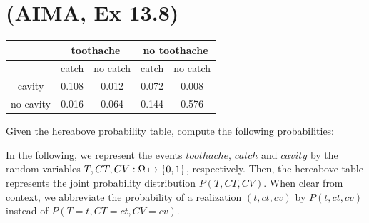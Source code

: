 \documentclass[11pt, a4paper]{article}
\begin{document}
\newpage

\section{(AIMA, Ex 13.8)}

\begin{center}
    \begin{tabular}{|c|c|c|c|c|}
        \hline
        & \multicolumn{2}{c|}{toothache} & \multicolumn{2}{c|}{no toothache} \\ \hline
        & catch & no catch & catch & no catch \\ \hline
        cavity & 0.108 & 0.012 & 0.072 & 0.008 \\ \hline
        no cavity & 0.016 & 0.064 & 0.144 & 0.576 \\ \hline
    \end{tabular}
    \vspace{1ex}
\end{center}

Given the hereabove probability table, compute the following probabilities:

\begin{solution}
    In the following, we represent the events $toothache$, $catch$ and $cavity$ by the random variables $T, CT, CV: \Omega \mapsto \{0, 1\}$, respectively. Then, the hereabove table represents the joint probability distribution $P(T, CT, CV)$. When clear from context, we abbreviate the probability of a realization $(t, ct, cv)$ by $P(t, ct, cv)$ instead of $P(T = t, CT = ct, CV = cv)$.
\end{solution}
\end{document}
